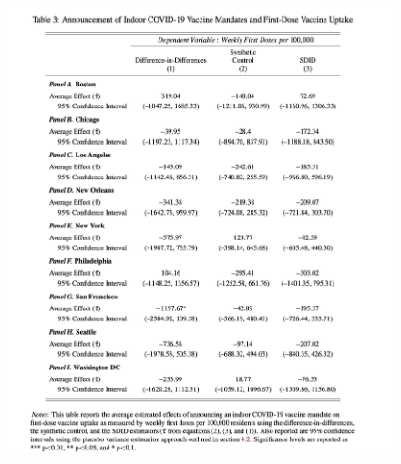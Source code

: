 \documentclass{beamer}
\begin{document}
\begin{frame}[plain]

	\begin{figure}
	\includegraphics[scale=0.3]{./lecture_includes/vitor_table3}
	\end{figure}

\end{frame}
\end{document}
